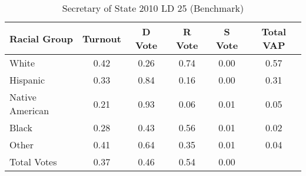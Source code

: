 \begin{table}[htb]
\begin{center}
\caption{Secretary of State 2010 LD 25 (Benchmark)}
\label{sos10_vap_ld_25_benchmark}
\begin{tabular}{lccccc}
  \hline
Racial Group & Turnout & D Vote & R Vote & S Vote & Total VAP \\ 
  \hline
White & 0.42 & 0.26 & 0.74 & 0.00 & 0.57 \\ 
  Hispanic & 0.33 & 0.84 & 0.16 & 0.00 & 0.31 \\ 
  Native American & 0.21 & 0.93 & 0.06 & 0.01 & 0.05 \\ 
  Black & 0.28 & 0.43 & 0.56 & 0.01 & 0.02 \\ 
  Other & 0.41 & 0.64 & 0.35 & 0.01 & 0.04 \\ 
  Total Votes & 0.37 & 0.46 & 0.54 & 0.00 &  \\ 
   \hline
\end{tabular}
\end{center}
\end{table}
